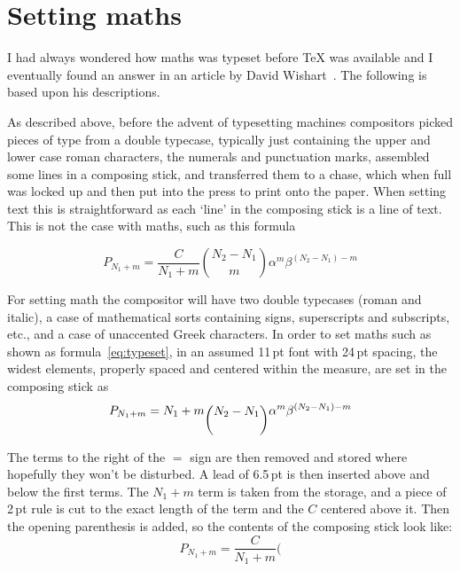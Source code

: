 \documentclass[10pt,letterpaper,extrafontsizes]{memoir}
\newcommand\U[2]{\textrm{#1}\,\textrm{#2}}
\begin{document}
\section{Setting maths}

    I had always wondered how maths was typeset before TeX was available and
I eventually found an answer in an article by David Wishart~\autocite{WISHART03}.
The following is based upon his descriptions.

    As described above, before the advent of typesetting machines compositors 
picked pieces of type from a double typecase, 
typically just containing the 
upper and lower case roman characters, the numerals and punctuation marks, 
assembled some lines in a composing stick, 
and transferred them to a chase, which when full was locked 
up and then 
put into the press to print onto the paper. When setting text this is
straightforward as each `line' in the composing stick is a line of text.
This is not the case with maths, such as this formula

\begin{equation} \label{eq:typeset}
P_{N_1 + m} = \frac{C}{N_{1} + m} \binom{N_{2} - N_{1}}{m}
              \alpha^{m}\beta^{(N_{2}-N_{1}) - m}
\end{equation}

    For setting math the compositor will have two double 
typecases (roman
and italic), a case of mathematical sorts containing signs, superscripts
and subscripts, etc., and a case of unaccented Greek characters.
    In order to set maths such as shown as formula~\ref{eq:typeset},
in an assumed \U{11}{pt} font with \U{24}{pt} spacing, 
the widest elements, properly spaced and centered within the measure, 
are set in the composing stick as
\begin{displaymath}
P_{N_1 + m} = N_{1} + m \raisebox{-0.6\baselineskip}{$\displaystyle\binom{N_{2} - N_{1}}{\phantom{m}}$}
              \alpha^{m}\beta^{(N_{2}-N_{1}) - m}
\end{displaymath}

    The terms to the right of the $=$ sign are then removed and stored where
hopefully they won't be disturbed. A lead of \U{6.5}{pt} is then inserted above and below 
the first terms.
The $N_{1} +m$ term is taken from the storage, and a piece of \U{2}{pt} rule is cut
to the exact length of the term and the $C$ centered above it. Then the opening
parenthesis is added, so the contents of the composing stick look like:
\begin{displaymath}
P_{N_1 + m} = \frac{C}{N_{1} + m} \bigg(
\end{displaymath}
\end{document}
